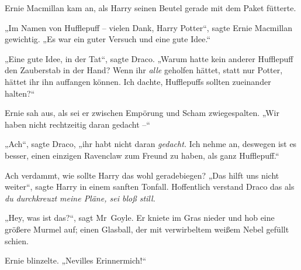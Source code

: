 Ernie Macmillan kam an, als Harry seinen Beutel gerade mit dem Paket fütterte.

„Im Namen von Hufflepuff – vielen Dank, Harry Potter“, sagte Ernie Macmillan gewichtig. „Es war ein guter Versuch und eine gute Idee.“

„Eine gute Idee, in der Tat“, sagte Draco. „Warum hatte kein anderer Hufflepuff den Zauberstab in der Hand? Wenn ihr \emph{alle} geholfen hättet, statt nur Potter, hättet ihr ihn auffangen können. Ich dachte, Hufflepuffs sollten zueinander halten?“

Ernie sah aus, als sei er zwischen Empörung und Scham zwiegespalten. „Wir haben nicht rechtzeitig daran gedacht –“

„Ach“, sagte Draco, „ihr habt nicht daran \emph{gedacht.} Ich nehme an, deswegen ist es besser, einen einzigen Ravenclaw zum Freund zu haben, als ganz Hufflepuff.“

Ach verdammt, wie sollte Harry das wohl geradebiegen? „Das hilft uns nicht weiter“, sagte Harry in einem sanften Tonfall. Hoffentlich verstand Draco das als \emph{du durchkreuzt meine Pläne, sei bloß still.}

„Hey, was ist das?“, sagt Mr~Goyle. Er kniete im Gras nieder und hob eine größere Murmel auf; einen Glasball, der mit verwirbeltem weißem Nebel gefüllt schien.

Ernie blinzelte. „Nevilles Erinnermich!“

